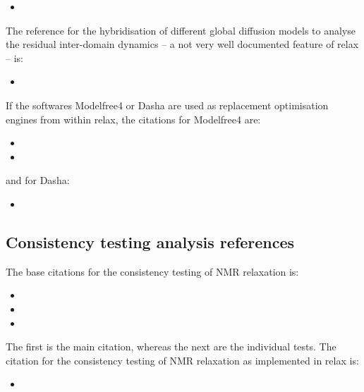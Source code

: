 \begin{itemize}
\item {}
\end{itemize}

The reference for the hybridisation of different global diffusion models to analyse the residual inter-domain dynamics -- a not very well documented feature of relax -- is:

\begin{itemize}
\item {}
\end{itemize}

If the softwares Modelfree4 or Dasha are used as replacement optimisation engines from within relax, the citations for Modelfree4 are:

\begin{itemize}
\item {}
\item {}
\end{itemize}

and for Dasha:

\begin{itemize}
\item {}
\end{itemize}



\subsection{Consistency testing analysis references}

The base citations for the consistency testing of NMR relaxation is:

\begin{itemize}
\item {}
\item {}
\item {}
\end{itemize}

The first is the main citation, whereas the next are the individual tests.  The citation for the consistency testing of NMR relaxation as implemented in relax is:

\begin{itemize}
\item {}
\end{itemize}


